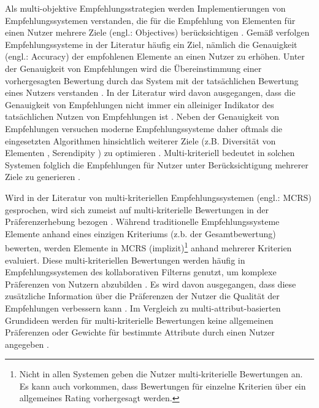 Als multi-objektive Empfehlungsstrategien werden Implementierungen von Empfehlungssystemen verstanden, die für die Empfehlung von Elementen für einen Nutzer mehrere Ziele (engl.: Objectives) berücksichtigen \cite[S. 850]{adomavicius:4:inbook}.
Gemäß \textcite[S. 1097]{mcnee:inproceedings} verfolgen Empfehlungssysteme in der Literatur häufig ein Ziel, nämlich die Genauigkeit (engl.: Accuracy) der empfohlenen Elemente an einen Nutzer zu erhöhen.
Unter der Genauigkeit von Empfehlungen wird die Übereinstimmung einer vorhergesagten Bewertung durch das System mit der tatsächlichen Bewertung eines Nutzers verstanden \cite[S. 1098]{mcnee:inproceedings}.
In der Literatur wird davon ausgegangen, dass die Genauigkeit von Empfehlungen nicht immer ein alleiniger Indikator des tatsächlichen Nutzen von Empfehlungen ist \cite[S. 1097]{mcnee:inproceedings}\cite[S. 850]{adomavicius:4:inbook}\cite[S. 896]{adomavicius:article}.
Neben der Genauigkeit von Empfehlungen versuchen moderne Empfehlungssysteme daher oftmals die eingesetzten Algorithmen hinsichtlich weiterer Ziele (z.B. Diversität von Elementen \cite[S. 896]{adomavicius:article}, Serendipity \cite[S. 1099]{mcnee:inproceedings}) zu optimieren \cite[S. 850]{adomavicius:4:inbook}.
Multi-kriteriell bedeutet in solchen Systemen folglich die Empfehlungen für Nutzer unter Berücksichtigung mehrerer Ziele zu generieren \cite[S. 850]{adomavicius:4:inbook}.

Wird in der Literatur von multi-kriteriellen Empfehlungssystemen (engl.: \ac{MCRS}) gesprochen, wird sich zumeist auf multi-kriterielle Bewertungen in der Präferenzerhebung bezogen \cite[S. 745]{adomavicius:inproceedings}\cite[S. 207]{hdioud:inproceedings}\cite[S. 1156]{gupta:inproceedings}.
Während traditionelle Empfehlungssysteme Elemente anhand eines einzigen Kriteriums (z.b. der Gesamtbewertung) bewerten, werden Elemente in \ac{MCRS} (implizit)\footnote{Nicht in allen Systemen geben die Nutzer multi-kriterielle Bewertungen an. Es kann auch vorkommen, dass Bewertungen für einzelne Kriterien über ein allgemeines Rating vorhergesagt werden.} anhand mehrerer Kriterien evaluiert.
Diese multi-kriteriellen Bewertungen werden häufig in Empfehlungssystemen des kollaborativen Filterns genutzt, um komplexe Präferenzen von Nutzern abzubilden \cite[S. 850]{adomavicius:4:inbook}.
Es wird davon ausgegangen, dass diese zusätzliche Information \cite[S. 49]{adomavicius:inproceedings:2} über die Präferenzen der Nutzer die Qualität der Empfehlungen verbessern kann \cite[S. 2]{adomavicius:5:inbook}.
Im Vergleich zu multi-attribut-basierten Grundideen werden für multi-kriterielle Bewertungen keine allgemeinen Präferenzen oder Gewichte für bestimmte Attribute durch einen Nutzer angegeben \cite[S. 851]{adomavicius:4:inbook}.

